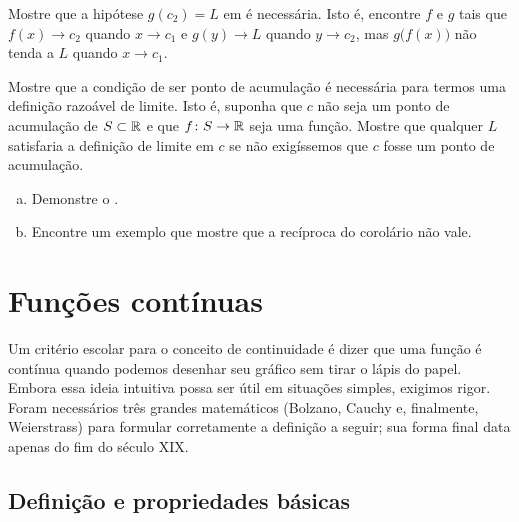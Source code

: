 \begin{exercise}[Desafio] \label{exercise:contlimitbadcomposition}
Mostre que a hipótese $g(c_2) = L$ em
 é necessária. Isto é, encontre $f$
e $g$ tais que $f(x) \to c_2$ quando $x \to c_1$ e
$g(y) \to L$ quando $y \to c_2$, mas $g\bigl(f(x)\bigr)$ não tenda a $L$
quando $x \to c_1$.
\end{exercise}

\begin{exercise}
Mostre que a condição de ser ponto de acumulação é necessária para termos uma
definição razoável de limite. Isto é, suponha que $c$ não seja um ponto de acumulação
de $S \subset {\mathbb{R}}$ e que $f \colon S \to {\mathbb{R}}$ seja uma função. Mostre que
qualquer $L$ satisfaria a definição de limite em $c$ se não exigíssemos que $c$
fosse um ponto de acumulação.
\end{exercise}

\begin{exercise}
\leavevmode
\begin{enumerate}[a)]
\item
Demonstre o .
\item
Encontre um exemplo que mostre que a recíproca do
corolário não vale.
\end{enumerate}
\end{exercise}






\sectionnewpage
\section{Funções contínuas}
\label{sec:cont}



Um critério escolar para o conceito de continuidade é dizer que uma função é
contínua quando podemos desenhar seu gráfico sem tirar o lápis do papel.
Embora essa ideia intuitiva possa ser útil em situações simples, exigimos
rigor. Foram necessários três grandes matemáticos (Bolzano, Cauchy e,
finalmente, Weierstrass) para formular corretamente a definição a seguir; sua
forma final data apenas do fim do século XIX.

\subsection{Definição e propriedades básicas}

